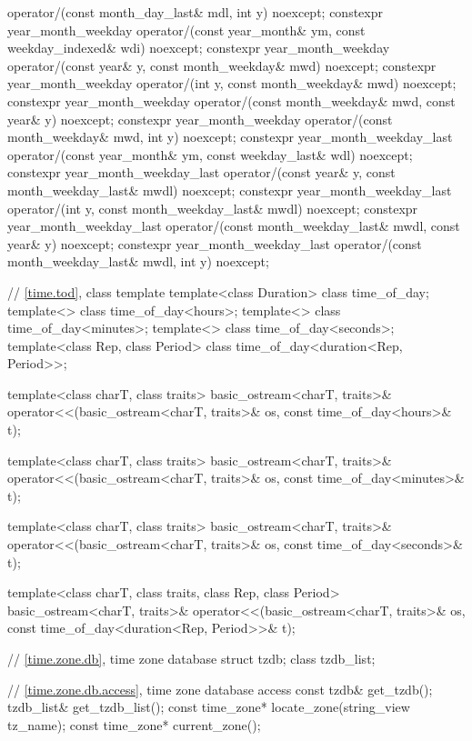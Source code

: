 \begin{codeblock}
{{      operator/(const month_day_last& mdl, int y) noexcept;
    constexpr year_month_weekday
      operator/(const year_month& ym, const weekday_indexed& wdi) noexcept;
    constexpr year_month_weekday
      operator/(const year& y, const month_weekday& mwd) noexcept;
    constexpr year_month_weekday
      operator/(int y, const month_weekday& mwd) noexcept;
    constexpr year_month_weekday
      operator/(const month_weekday& mwd, const year& y) noexcept;
    constexpr year_month_weekday
      operator/(const month_weekday& mwd, int y) noexcept;
    constexpr year_month_weekday_last
      operator/(const year_month& ym, const weekday_last& wdl) noexcept;
    constexpr year_month_weekday_last
      operator/(const year& y, const month_weekday_last& mwdl) noexcept;
    constexpr year_month_weekday_last
      operator/(int y, const month_weekday_last& mwdl) noexcept;
    constexpr year_month_weekday_last
      operator/(const month_weekday_last& mwdl, const year& y) noexcept;
    constexpr year_month_weekday_last
      operator/(const month_weekday_last& mwdl, int y) noexcept;

    // \ref{time.tod}, class template 
    template<class Duration> class time_of_day;
    template<> class time_of_day<hours>;
    template<> class time_of_day<minutes>;
    template<> class time_of_day<seconds>;
    template<class Rep, class Period> class time_of_day<duration<Rep, Period>>;

    template<class charT, class traits>
      basic_ostream<charT, traits>&
        operator<<(basic_ostream<charT, traits>& os, const time_of_day<hours>& t);

    template<class charT, class traits>
      basic_ostream<charT, traits>&
        operator<<(basic_ostream<charT, traits>& os, const time_of_day<minutes>& t);

    template<class charT, class traits>
      basic_ostream<charT, traits>&
        operator<<(basic_ostream<charT, traits>& os, const time_of_day<seconds>& t);

    template<class charT, class traits, class Rep, class Period>
      basic_ostream<charT, traits>&
        operator<<(basic_ostream<charT, traits>& os,
                   const time_of_day<duration<Rep, Period>>& t);

    // \ref{time.zone.db}, time zone database
    struct tzdb;
    class tzdb_list;

    // \ref{time.zone.db.access}, time zone database access
    const tzdb& get_tzdb();
    tzdb_list& get_tzdb_list();
    const time_zone* locate_zone(string_view tz_name);
    const time_zone* current_zone();

}}
\end{codeblock}
